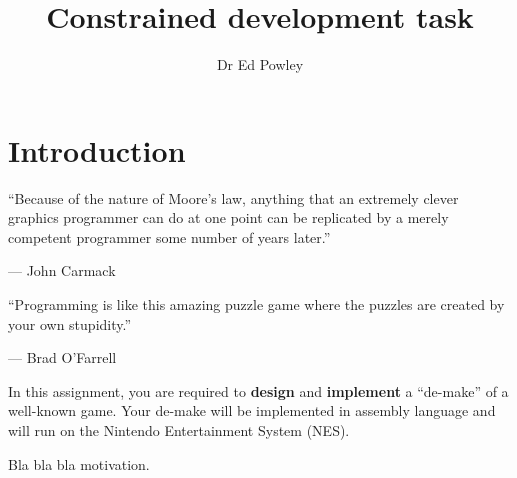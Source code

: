 \documentclass{../../fal_assignment}
\title{Constrained development task}
\author{Dr Ed Powley}
\begin{document}
\maketitle

\section*{Introduction}

\begin{marginquote}
``Because of the nature of Moore's law, anything that an extremely clever graphics programmer can do at one point can be replicated by a merely competent programmer some number of years later.''

--- John Carmack

    \marginquoterule

``Programming is like this amazing puzzle game where the puzzles are created by your own stupidity.''

--- Brad O'Farrell
\end{marginquote}

In this assignment, you are required to \textbf{design} and \textbf{implement} a ``de-make''
of a well-known game. Your de-make will be implemented in assembly language and will run on the 
Nintendo Entertainment System (NES).

Bla bla bla motivation.
\end{document}
